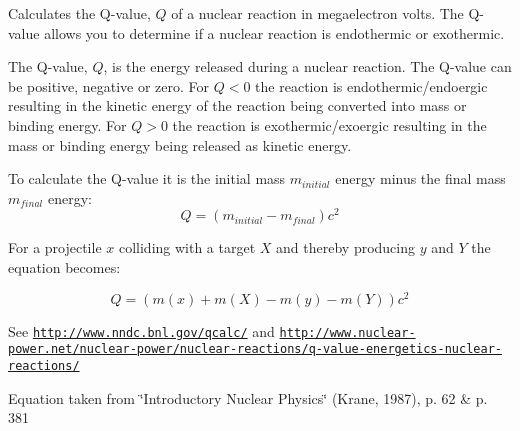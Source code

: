 Calculates the Q-\/value, $Q$ of a nuclear reaction in megaelectron volts. The Q-\/value allows you to determine if a nuclear reaction is endothermic or exothermic. 

The Q-\/value, $Q$, is the energy released during a nuclear reaction. The Q-\/value can be positive, negative or zero. For $Q < 0$ the reaction is endothermic/endoergic resulting in the kinetic energy of the reaction being converted into mass or binding energy. For $Q > 0$ the reaction is exothermic/exoergic resulting in the mass or binding energy being released as kinetic energy.

To calculate the Q-\/value it is the initial mass $m_{initial}$ energy minus the final mass $m_{final}$ energy\+: \[Q = \left ( m_{initial}-m_{final}\right ) c^2\]

For a projectile $x$ colliding with a target $X$ and thereby producing $y$ and $Y$ the equation becomes\+:

\[Q = \left ( m(x) + m (X) - m(y) - m(Y) \right ) c^2\]

See \href{http://www.nndc.bnl.gov/qcalc/}{\tt http\+://www.\+nndc.\+bnl.\+gov/qcalc/} and \href{http://www.nuclear-power.net/nuclear-power/nuclear-reactions/q-value-energetics-nuclear-reactions/}{\tt http\+://www.\+nuclear-\/power.\+net/nuclear-\/power/nuclear-\/reactions/q-\/value-\/energetics-\/nuclear-\/reactions/}

Equation taken from \char`\"{}\+Introductory Nuclear Physics\char`\"{} (Krane, 1987), p. 62 \& p. 381


